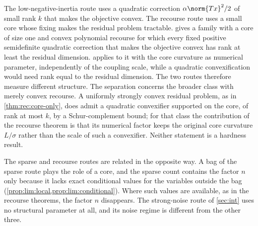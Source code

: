 The low-negative-inertia route uses a quadratic correction
$\alpha\norm{Tx}^2/2$ of small rank $k$ that makes the objective convex. The
recourse route uses a small core whose fixing makes the residual problem
tractable.  gives a family with a core of size one and
convex polynomial recourse for which every fixed positive semidefinite
quadratic correction that makes the objective convex has rank at least the
residual dimension.  applies to it with the core
curvature as numerical parameter, independently of the coupling scale, while
a quadratic convexification would need rank equal to the residual
dimension. The two routes therefore measure different structure. The separation concerns the
broader class with merely convex recourse. A uniformly strongly convex
residual problem, as in \cref{thm:rec:core-only}, does admit a quadratic
convexifier supported on the core, of rank at most $k$, by a Schur-complement
bound; for that class the contribution of the recourse theorem is that its
numerical factor keeps the original core curvature $L/\sigma$ rather than the
scale of such a convexifier. Neither statement is a hardness result.

The sparse and recourse routes are related in the opposite way. A bag of the
sparse route plays the role of a core, and the sparse count contains the
factor $n$ only because it lacks exact conditional values for the variables
outside the bag (\cref{prop:lim:local,prop:lim:conditional}). Where such
values are available, as in the recourse theorems, the factor $n$
disappears. The strong-noise
route of \cref{sec:int} uses no structural parameter at all, and its noise
regime is different from the other three.
